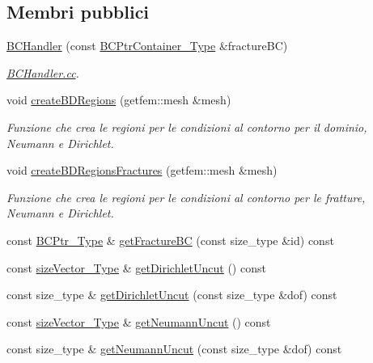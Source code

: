 \subsection*{Membri pubblici}
\begin{DoxyCompactItemize}
\item 
\hyperlink{classBCHandler_af15c3846a782d6b7db1985c69929c388}{B\-C\-Handler} (const \hyperlink{BC_8h_ae127263052e0676d0fe233f834ca7227}{B\-C\-Ptr\-Container\-\_\-\-Type} \&fracture\-B\-C)
\begin{DoxyCompactList}\small\item\em \hyperlink{BCHandler_8cc}{B\-C\-Handler.\-cc}. \end{DoxyCompactList}\item 
void \hyperlink{classBCHandler_a1dcccdbb5e0eb0d044455414b52b2f05}{create\-B\-D\-Regions} (getfem\-::mesh \&mesh)
\begin{DoxyCompactList}\small\item\em Funzione che crea le regioni per le condizioni al contorno per il dominio, Neumann e Dirichlet. \end{DoxyCompactList}\item 
void \hyperlink{classBCHandler_a559e4ba01fc7c6326dbb949d06dbd525}{create\-B\-D\-Regions\-Fractures} (getfem\-::mesh \&mesh)
\begin{DoxyCompactList}\small\item\em Funzione che crea le regioni per le condizioni al contorno per le fratture, Neumann e Dirichlet. \end{DoxyCompactList}\item 
const \hyperlink{BC_8h_a088c36f945ad8f6e7e0c7c423994c6ec}{B\-C\-Ptr\-\_\-\-Type} \& \hyperlink{classBCHandler_a2ab65711f8ee3643ecf19de52ceab470}{get\-Fracture\-B\-C} (const size\-\_\-type \&id) const 
\item 
const \hyperlink{Core_8h_a83c51913d041a5001e8683434c09857f}{size\-Vector\-\_\-\-Type} \& \hyperlink{classBCHandler_a68a01c71517202ed89ebc82a56e4cb5d}{get\-Dirichlet\-Uncut} () const 
\item 
const size\-\_\-type \& \hyperlink{classBCHandler_a3f92a68c9b0dbebc6ee72a42b419645d}{get\-Dirichlet\-Uncut} (const size\-\_\-type \&dof) const 
\item 
const \hyperlink{Core_8h_a83c51913d041a5001e8683434c09857f}{size\-Vector\-\_\-\-Type} \& \hyperlink{classBCHandler_a5b1c86a6c303abf33850132d1bc12693}{get\-Neumann\-Uncut} () const 
\item 
const size\-\_\-type \& \hyperlink{classBCHandler_a2bf41619c541b124b421d8664786a055}{get\-Neumann\-Uncut} (const size\-\_\-type \&dof) const 

\end{DoxyCompactItemize}
